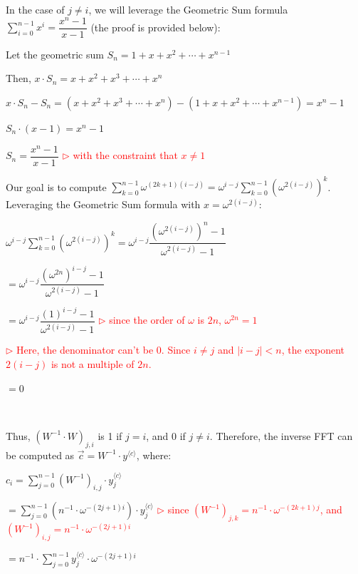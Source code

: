 In the case of $j \neq i$, we will leverage the Geometric Sum formula $\sum\limits_{i=0}^{n-1}x^i = \dfrac{x^n - 1}{x - 1}$ (the proof is provided below):

\begin{tcolorbox}[title={\textbf{\tboxtheorem{\ref*{subsec:ntt-backward}} Geometric Sum Formula}}]

Let the geometric sum $S_n = 1 + x + x^2 + \cdots + x^{n - 1}$

Then, $x \cdot S_n = x + x^2 + x^3 + \cdots + x^{n}$

$x \cdot S_n - S_n = (x + x^2 + x^3 + \cdots + x^{n}) - (1 + x + x^2 + \cdots + x^{n - 1}) = x^n - 1$

$S_n\cdot (x - 1) = x^n - 1$

$S_n = \dfrac{x^n - 1}{x - 1}$ \textcolor{red}{ $\rhd$ with the constraint that $x \neq 1$}

\end{tcolorbox}

Our goal is to compute $\sum\limits_{k=0}^{n-1}\omega^{(2k+1)(i-j)} = \omega^{i-j} \sum\limits_{k=0}^{n-1}(\omega^{2(i-j)})^k$. Leveraging the Geometric Sum formula with $x = \omega^{2(i-j)}$:

$\omega^{i-j} \sum\limits_{k=0}^{n-1}(\omega^{2(i-j)})^k = \omega^{i-j} \dfrac{(\omega^{2(i-j)})^n - 1}{\omega^{2(i-j)} - 1}$ 

$= \omega^{i-j} \dfrac{(\omega^{2n})^{i - j} - 1}{\omega^{2(i-j)} - 1}$

$= \omega^{i-j} \dfrac{(1)^{i - j} - 1}{\omega^{2(i-j)} - 1}$ \textcolor{red}{ $\rhd$ since the order of $\omega$ is $2n$, $\omega^{2n}=1$}

\textcolor{red}{ $\rhd$ Here, the denominator can't be 0. Since $i \neq j$ and $|i-j| < n$, the exponent $2(i-j)$ is not a multiple of $2n$.}

$= 0$

$ $

Thus, $(W^{-1} \cdot W)_{j, i}$ is 1 if $j = i$, and 0 if $j \neq i$. Therefore, the inverse FFT can be computed as $\vec{c} = W^{-1} \cdot y^{\langle c \rangle}$, where: 

$c_i = \sum_{j=0}^{n-1} (W^{-1})_{i,j} \cdot y_j^{\langle c \rangle}$

$ = \sum\limits_{j=0}^{n-1} \left( n^{-1} \cdot \omega^{-(2j+1)i} \right) \cdot y_j^{\langle c \rangle}$ \textcolor{red}{ $\rhd$ since $(W^{-1})_{j,k} = n^{-1} \cdot \omega^{-(2k+1)j}$, and $(W^{-1})_{i,j} = n^{-1} \cdot \omega^{-(2j+1)i}$}

$ = n^{-1}\cdot \sum\limits_{j=0}^{n-1}{y}_j^{\langle c \rangle} \cdot \omega^{-(2j+1)i}$

